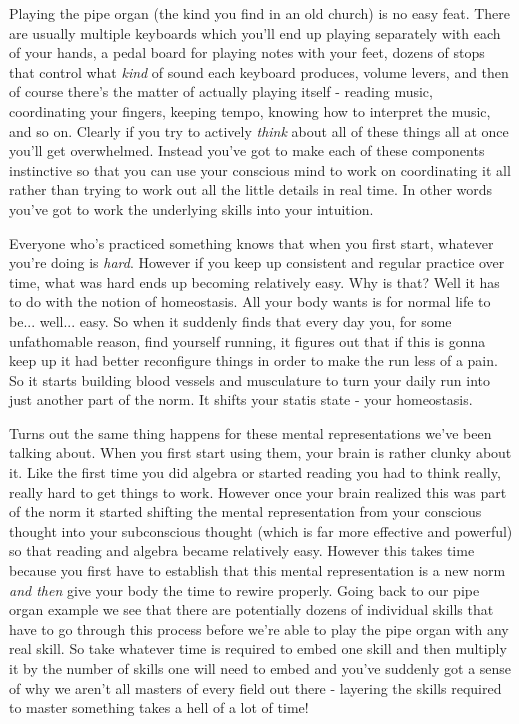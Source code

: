 \documentclass[11pt,a5paper]{book}
\begin{document}
Playing the pipe organ (the kind you find in an old church) is no easy feat. There are usually multiple keyboards which you'll end up playing separately with each of your hands, a pedal board for playing notes with your feet, dozens of stops that control what \textit{kind} of sound each keyboard produces, volume levers, and then of course there's the matter of actually playing itself - reading music, coordinating your fingers, keeping tempo, knowing how to interpret the music, and so on. Clearly if you try to actively \textit{think} about all of these things all at once you'll get overwhelmed. Instead you've got to make each of these components instinctive so that you can use your conscious mind to work on coordinating it all rather than trying to work out all the little details in real time. In other words you've got to work the underlying skills into your intuition.
\newline 

Everyone who's practiced something knows that when you first start, whatever you're doing is \textit{hard}. However if you keep up consistent and regular practice over time, what was hard ends up becoming relatively easy. Why is that? Well it has to do with the notion of homeostasis. All your body wants is for normal life to be... well... easy. So when it suddenly finds that every day you, for some unfathomable reason, find yourself running, it figures out that if this is gonna keep up it had better reconfigure things in order to make the run less of a pain. So it starts building blood vessels and musculature to turn your daily run into just another part of the norm. It shifts your statis state - your homeostasis. 
\newline

Turns out the same thing happens for these mental representations we've been talking about. When you first start using them, your brain is rather clunky about it. Like the first time you did algebra or started reading you had to think really, really hard to get things to work. However once your brain realized this was part of the norm it started shifting the mental representation from your conscious thought into your subconscious thought (which is far more effective and powerful) so that reading and algebra became relatively easy. However this takes time because you first have to establish that this mental representation is a new norm \textit{and then} give your body the time to rewire properly. Going back to our pipe organ example we see that there are potentially dozens of individual skills that have to go through this process before we're able to play the pipe organ with any real skill. So take whatever time is required to embed one skill and then multiply it by the number of skills one will need to embed and you've suddenly got a sense of why we aren't all masters of every field out there - layering the skills required to master something takes a hell of a lot of time!
\newline
\end{document}
